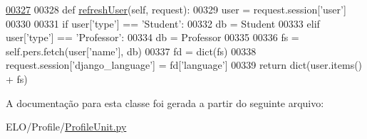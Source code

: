 \begin{DoxyCode}
\hypertarget{classProfile_1_1ProfileUnit_1_1BusProfile_l00327}{}\hyperlink{classProfile_1_1ProfileUnit_1_1BusProfile_a87c3d0374f709af7904656938eafd6d3}{00327} 
00328     \textcolor{keyword}{def }\hyperlink{classProfile_1_1ProfileUnit_1_1BusProfile_a87c3d0374f709af7904656938eafd6d3}{refreshUser}(self, request):
00329         user = request.session[\textcolor{stringliteral}{'user'}]
00330 
00331         \textcolor{keywordflow}{if} user[\textcolor{stringliteral}{'type'}] == \textcolor{stringliteral}{'Student'}:
00332             db = Student
00333         \textcolor{keywordflow}{elif} user[\textcolor{stringliteral}{'type'}] == \textcolor{stringliteral}{'Professor'}:
00334             db = Professor
00335 
00336         fs = self.pers.fetch(user[\textcolor{stringliteral}{'name'}], db)
00337         fd = dict(fs)
00338         request.session[\textcolor{stringliteral}{'django\_language'}] = fd[\textcolor{stringliteral}{'language'}]
00339         \textcolor{keywordflow}{return} dict(user.items() + fs)

\end{DoxyCode}


A documentação para esta classe foi gerada a partir do seguinte arquivo\-:\begin{DoxyCompactItemize}
\item 
E\-L\-O/\-Profile/\hyperlink{ProfileUnit_8py}{Profile\-Unit.\-py}\end{DoxyCompactItemize}

